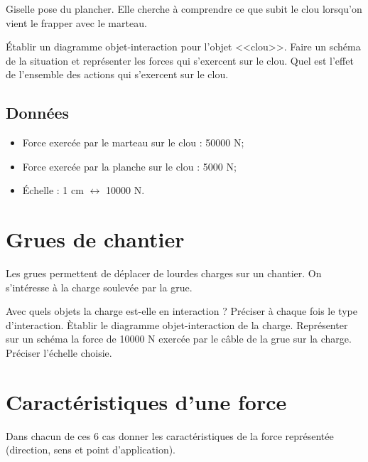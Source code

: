\documentclass[a4paper,11pt]{exam}
\begin{document}
Giselle pose du plancher. Elle cherche à comprendre ce que subit le clou lorsqu'on vient le frapper avec le marteau.

\begin{questions}
	\question \'Etablir un diagramme objet-interaction pour l'objet <<clou>>.
	\question Faire un schéma de la situation et représenter les forces qui s'exercent sur le clou.
	\question Quel est l'effet de l'ensemble des actions qui s'exercent sur le clou.
	
\end{questions}

\subsection*{Données}
	\begin{itemize}
		\item Force exercée par le marteau sur le clou : \num{50000} N;
		\item Force exercée par la planche sur le clou : \num{5000} N;
		\item \'Echelle : 1 cm $\leftrightarrow$ \num{10000} N.
	\end{itemize}

\section{Grues de chantier}

Les grues permettent de déplacer de lourdes charges sur un chantier. On s'intéresse à la charge soulevée par la grue.

\begin{questions}
	\question Avec quels objets la charge est-elle en interaction ? Préciser à chaque fois le type d'interaction.
	\question Ètablir le diagramme objet-interaction de la charge.
	\question Représenter sur un schéma la force de \num{10000} N exercée par le câble de la grue sur la charge. Préciser l'échelle choisie.
\end{questions}



\section{Caractéristiques d'une force}

Dans chacun de ces 6 cas donner les caractéristiques de la force représentée (direction, sens et point d'application).
\end{document}
